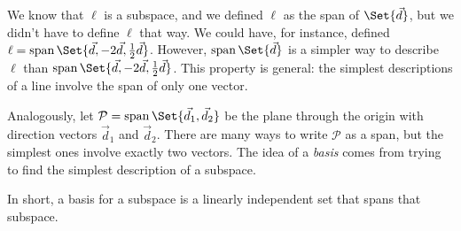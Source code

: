 \begin{center}
\end{center}

We know that $\ell$ is a subspace, and we defined $\ell$ as the span of $\Set{\vec d}$,
but we didn't have to define $\ell$ that way. We could have, for instance, defined $\ell=\Span\Set{\vec d,-2\vec d,\tfrac{1}{2}\vec d}$. However,
$\Span\Set{\vec d}$ is a simpler way to describe $\ell$ than $\Span\Set{\vec d,-2\vec d,\tfrac{1}{2}\vec d}$.
This property is general: the simplest descriptions of a line involve the span of only one vector.


Analogously, let $\mathcal P=\Span\Set{\vec d_1,\vec d_2}$ be the plane
through the origin with direction vectors $\vec d_1$ and $\vec d_2$. There
are many ways to write $\mathcal P$ as a span, but the simplest ones
involve exactly two vectors. The idea of a \emph{basis} comes
from trying to find the simplest description of a subspace.


In short, a basis for a subspace is a linearly independent set that spans that
subspace.

